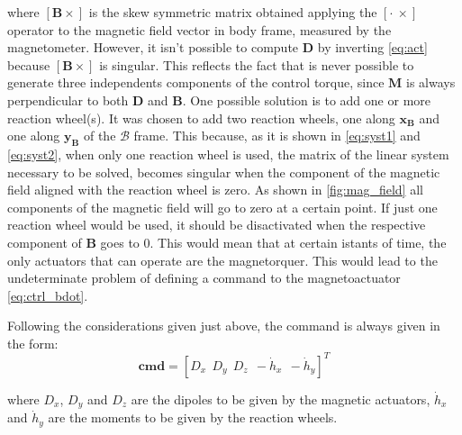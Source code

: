 where $[\boldsymbol{B} \times]$ is the skew symmetric matrix obtained applying the $[\cdot \ \times] $ operator to the magnetic field vector in body frame, measured by the magnetometer.
However, it isn't possible to compute $\boldsymbol{D}$ by inverting \autoref{eq:act} because $[\boldsymbol{B} \times]$ is singular. This reflects the fact that is never possible to generate three independents components of the control torque, since $\boldsymbol{M}$ is always perpendicular to both $\boldsymbol{D}$ and $\boldsymbol{B}$. One possible solution is to add one or more reaction wheel(s). It was chosen to add two reaction wheels, one along $\boldsymbol{x_B}$ and one along $\boldsymbol{y_B}$ of the $\mathcal{B}$ frame. This because, as it is shown in \autoref{eq:syst1} and \autoref{eq:syst2}, when only one reaction wheel is used, the matrix of the linear system necessary to be solved, becomes singular when the component of the magnetic field aligned with the reaction wheel is zero. As shown in \autoref{fig:mag_field} all components of the magnetic field will go to zero at a certain point. 
If just one reaction wheel would be used, it should be disactivated when the respective component of $\boldsymbol{B}$ goes to 0. This would mean that at certain istants of time, the only actuators that can operate are the magnetorquer. This would lead 
to the undeterminate problem of defining a command to the magnetoactuator \autoref{eq:ctrl_bdot}.  

Following the considerations given just above, the command is always given in the form:
\begin{equation}
    \label{eq:cmd}
    \boldsymbol{cmd} = [D_x \ \ D_y \ \ D_z \ \ -\Dot{h}_x \ \ -\Dot{h}_y]^T
\end{equation}

where $D_x$, $D_y$ and $D_z$ are the dipoles to be given by the magnetic actuators, $\Dot{h}_x$ and $\Dot{h}_y$ are the moments to be given by the reaction wheels.

